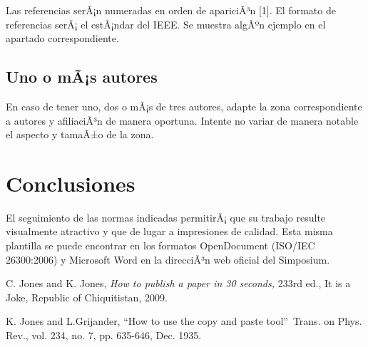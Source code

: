 \documentclass[10pt,conference,a4paper]{IEEEtran}%
\begin{document}
Las referencias serÃ¡n numeradas en orden de apariciÃ³n [1]. El formato de
referencias serÃ¡ el estÃ¡ndar del IEEE. Se muestra algÃºn ejemplo en el apartado correspondiente.

\subsection{Uno o mÃ¡s autores}

En caso de tener uno, dos o mÃ¡s de tres autores, adapte la zona
correspondiente a autores y afiliaciÃ³n de manera oportuna. Intente no variar
de manera notable el aspecto y tamaÃ±o de la zona.

\section{Conclusiones}

El seguimiento de las normas indicadas permitirÃ¡ que su trabajo resulte
visualmente atractivo y que de lugar a impresiones de calidad. Esta misma
plantilla se puede encontrar en los formatos OpenDocument (ISO/IEC 26300:2006)
y Microsoft Word\textsuperscript{\textregistered} en la direcciÃ³n web oficial del Simposium.


\begin{thebibliography}{9}                                                                                                %
    C. Jones and K. Jones, \emph{How to publish a paper in 30
	seconds,} 233rd ed., It is a Joke, Republic of Chiquitistan, 2009.

    K. Jones and L.Grijander, \textquotedblleft How to use
	the copy and paste tool\textquotedblright\ Trans. on Phys. Rev., vol. 234, no.
	7, pp. 635-646, Dec. 1935.
\end{thebibliography}
\end{document}

